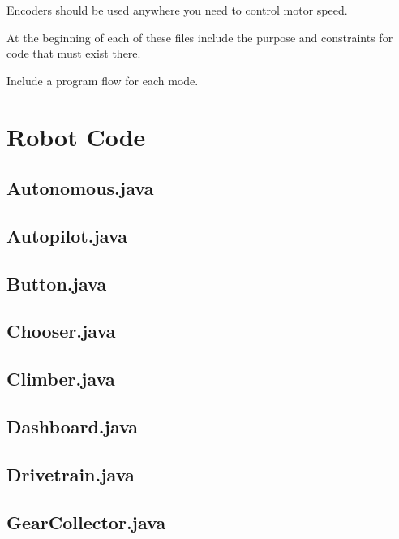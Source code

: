 \documentclass[letterpaper,10pt]{memoir}
\newcommand{\filelister}[1]{%
		
	}
\begin{document}
Encoders should be used anywhere you need to control motor speed.




At the beginning of each of these files include the purpose and constraints for code that must exist there.

Include a program flow for each mode.





\newpage\chapter{Robot Code}

\newpage\section*{Autonomous.java}
\filelister{Autonomous.java}

\newpage\section*{Autopilot.java}
\filelister{Autonomous.java}

\newpage\section*{Button.java}
\filelister{Button.java}

\newpage\section*{Chooser.java}
\filelister{Chooser.java}

\newpage\section*{Climber.java}
\filelister{Climber.java}

\newpage\section*{Dashboard.java}
\filelister{Dashboard.java}

\newpage\section*{Drivetrain.java}
\filelister{Drivetrain.java}

\newpage\section*{GearCollector.java}
\filelister{GearCollector.java}
\end{document}
